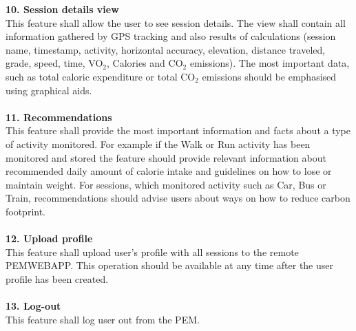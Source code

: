 \documentclass[12pt, a4paper]{report}   %
\begin{document}
\begin{enumerate}
\textbf{10. Session details view}\\
This feature shall allow the user to see session details. The view shall contain all information gathered by GPS tracking and also results of calculations (session name, timestamp, activity, horizontal accuracy, elevation, distance traveled, grade, speed, time, VO$_{2}$, Calories and CO$_{2}$ emissions). The most important data, such as total caloric expenditure or total CO$_{2}$ emissions should be emphasised using graphical aids.\\ \\
\textbf{11. Recommendations}\\
This feature shall provide the most important information and facts about a type of activity monitored. For example if the Walk or Run activity has been monitored and stored the feature should provide relevant information about recommended daily amount of calorie intake and guidelines on how to lose or maintain weight. For sessions, which monitored activity such as Car, Bus or Train, recommendations should advise users about ways on how to reduce carbon footprint.\\ \\
\textbf{12. Upload profile}\\
This feature shall upload user's profile with all sessions to the remote PEMWEBAPP. This operation should be available at any time after the user profile has been created.\\ \\
\textbf{13. Log-out}\\
This feature shall log user out from the PEM.\\ \\

\end{enumerate}
\end{document}
